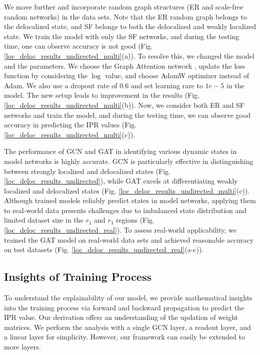 \documentclass[aps, prd, showpacs, floatfix, superscriptaddress, twocolumn, nofootinbib, preprintnumbers, longbibliography]{revtex4-2}
\begin{document}
We move further and incorporate random graph structures (ER and scale-free random networks) in the data sets. Note that the ER random graph belongs to the delocalized state, and SF belongs to both the delocalized and weakly localized state. We train the model with only the SF networks, and during the testing time, one can observe accuracy is not good (Fig. \ref{loc_deloc_results_undirected_multi}(a)). To resolve this, we changed the model and the parameters. We choose the Graph Attention network \cite{velivckovic2017graph}, update the loss function by considering the $\log$ value, and choose AdamW optimizer instead of Adam. We also use a dropout rate of $0.6$ and set learning rare to $1e-5$ in the model. The new setup leads to improvement in the results (Fig. \ref{loc_deloc_results_undirected_multi}(b)). Now, we consider both ER and SF networks and train the model, and during the testing time, we can observe good accuracy in predicting the IPR values (Fig. \ref{loc_deloc_results_undirected_multi}(c)). 

The performance of GCN and GAT in identifying various dynamic states in model networks is highly accurate. GCN is particularly effective in distinguishing between strongly localized and delocalized states (Fig. \ref{loc_deloc_results_undirected}), while GAT excels at differentiating weakly localized and delocalized states (Fig. \ref{loc_deloc_results_undirected_multi}(c)). Although trained models reliably predict states in model networks, applying them to real-world data presents challenges due to imbalanced state distribution and limited dataset size in the $r_1$ and $r_3$ regions (Fig. \ref{loc_deloc_results_undirected_real}). To assess real-world applicability, we trained the GAT model on real-world data sets and achieved reasonable accuracy on test datasets (Fig. \ref{loc_deloc_results_undirected_real}(a-c)).

\subsection{Insights of Training Process}
To understand the explainability of our model, we provide mathematical insights into the training process via forward and backward propagation to predict the IPR value. Our derivation offers an understanding of the updation of weight matrices. We perform the analysis with a single GCN layer, a readout layer, and a linear layer for simplicity. However, our framework can easily be extended to more layers.

\vspace{2mm}
\end{document}
